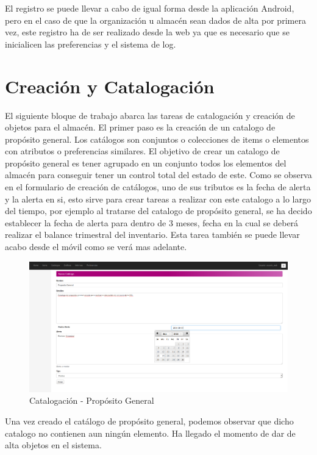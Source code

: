 \documentclass[a4paper,11pt]{book}
\begin{document}
El registro se puede llevar a cabo de igual forma desde la aplicación Android, pero en el caso de que la organización u almacén sean dados de alta por primera vez, este registro ha de ser realizado desde la web ya que es necesario que se inicialicen las preferencias y el sistema de log.


\section{Creación y Catalogación}

El siguiente bloque de trabajo abarca las tareas de catalogación y creación de objetos para el almacén. El primer paso es la creación de un catalogo de propósito general. Los catálogos son conjuntos o colecciones de items o elementos con atributos o preferencias similares. El objetivo de crear un catalogo de propósito general es tener agrupado en un conjunto todos los elementos del almacén para conseguir tener un control total del estado de este. Como se observa en el formulario de creación de catálogos, uno de sus tributos es la fecha de alerta y la alerta en si, esto sirve para crear tareas a realizar con este catalogo a lo largo del tiempo, por ejemplo al tratarse del catalogo de propósito general, se ha decido establecer la fecha de alerta para dentro de 3 meses, fecha en la cual se deberá realizar el balance trimestral del inventario. Esta tarea también se puede llevar acabo desde el móvil como se verá mas adelante. 

\begin{figure}[H] 
\centering 
\includegraphics[scale=0.3]{imagenes/pruebas/catalogo_general.png}
\caption{ Catalogación - Propósito General\cite{propio}}
\end{figure}

Una vez creado el catálogo de propósito general, podemos observar que dicho catalogo no contienen aun ningún elemento. Ha llegado el momento de dar de alta objetos en el sistema. 
\end{document}
